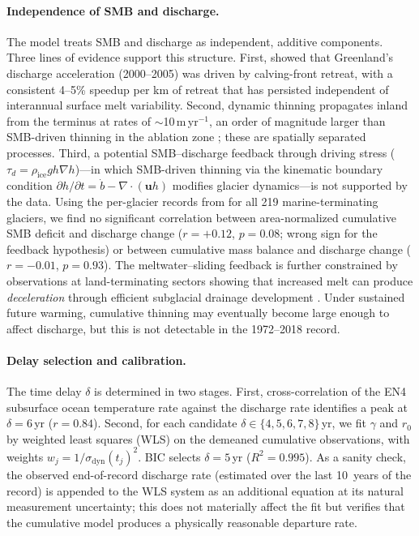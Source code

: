 \documentclass[11pt]{article}
\begin{document}
\paragraph{Independence of SMB and discharge.}
The model treats SMB and discharge as independent, additive components. Three lines of evidence support this structure. First, \citet{King2020} showed that Greenland's discharge acceleration (2000--2005) was driven by calving-front retreat, with a consistent 4--5\% speedup per km of retreat that has persisted independent of interannual surface melt variability. Second, dynamic thinning propagates inland from the terminus at rates of $\sim$10\,m\,yr$^{-1}$, an order of magnitude larger than SMB-driven thinning in the ablation zone \citep{Felikson2017}; these are spatially separated processes. Third, a potential SMB--discharge feedback through driving stress ($\tau_d = \rho_{\mathrm{ice}} g h \nabla h$)---in which SMB-driven thinning via the kinematic boundary condition $\partial h/\partial t = \dot{b} - \nabla \cdot (\mathbf{u} h)$ modifies glacier dynamics---is not supported by the data. Using the per-glacier records from \citet{Mouginot2019} for all 219 marine-terminating glaciers, we find no significant correlation between area-normalized cumulative SMB deficit and discharge change ($r = +0.12$, $p = 0.08$; wrong sign for the feedback hypothesis) or between cumulative mass balance and discharge change ($r = -0.01$, $p = 0.93$). The meltwater--sliding feedback is further constrained by observations at land-terminating sectors showing that increased melt can produce \emph{deceleration} through efficient subglacial drainage development \citep{Tedstone2015}. Under sustained future warming, cumulative thinning may eventually become large enough to affect discharge, but this is not detectable in the 1972--2018 record.

\paragraph{Delay selection and calibration.}
The time delay $\delta$ is determined in two stages. First, cross-correlation of the EN4 subsurface ocean temperature rate against the \citet{Mouginot2019} discharge rate identifies a peak at $\delta = 6$\,yr ($r = 0.84$). Second, for each candidate $\delta \in \{4, 5, 6, 7, 8\}$\,yr, we fit $\gamma$ and $r_0$ by weighted least squares (WLS) on the demeaned cumulative observations, with weights $w_j = 1/\sigma_{\mathrm{dyn}}(t_j)^2$. BIC selects $\delta = 5$\,yr ($R^2 = 0.995$). As a sanity check, the observed end-of-record discharge rate (estimated over the last 10~years of the \citet{Mouginot2019} record) is appended to the WLS system as an additional equation at its natural measurement uncertainty; this does not materially affect the fit but verifies that the cumulative model produces a physically reasonable departure rate.
\end{document}
